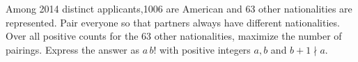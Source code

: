 Among 2014 distinct applicants,1006 are American and 63 other nationalities are represented. Pair everyone so that partners always have different nationalities. Over all positive counts for the 63 other nationalities, maximize the number of pairings. Express the answer as $a\,b!$ with positive integers $a,b$ and $b+1\nmid a$.
